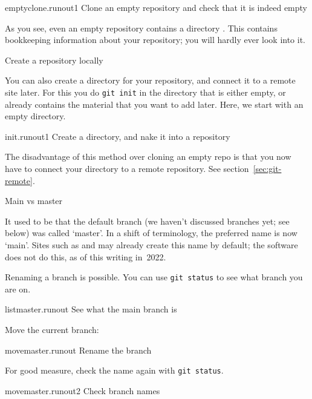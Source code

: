 \begin{gitstep}{emptyclone.runout1}
  Clone an empty repository and check that it is indeed empty
\end{gitstep}

As you see, even an empty repository contains a directory .
This contains bookkeeping information about your repository;
you will hardly ever look into it.

\newpage
{} {Create a repository locally}

You can also create a directory for your repository,
  and connect it to a remote site later.
  For this you do \lstinline{git init}
  in the directory that is either empty,
  or already contains the material that you want to add later.
  Here, we start with an empty directory.

\begin{gitstep}{init.runout1}
  Create a directory, and nake it into a repository
\end{gitstep}

The disadvantage of this method
over cloning an empty repo
is that you now have to connect your directory to a remote repository.
See section~\ref{sec:git-remote}.

\newpage
{} {Main vs master}

It used to be that the default branch
(we haven't discussed branches yet; see below)
was called `master'.
In a shift of terminology, the preferred name is now `main'.
Sites such as  and 
may already create this name by default;
the  software does not do this, as of this writing in~2022.

Renaming a branch is possible.
You can use \lstinline{git status} to see what branch you are on.

\begin{gitstep}{listmaster.runout}
  See what the main branch is
\end{gitstep}

Move the current branch:

\begin{gitstep}{movemaster.runout}
  Rename the branch
\end{gitstep}

For good measure, check the name again with \lstinline{git status}.

\begin{gitstep}{movemaster.runout2}
  Check branch names
\end{gitstep}

